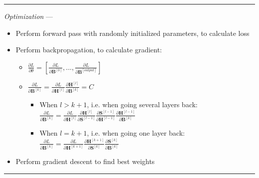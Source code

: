 {\color{lightgray}\hrule height 0.001mm}

\emph{Optimization} ---
\begin{itemize}
    \item Perform forward pass with randomly initialized parameters, to calculate loss
    \item Perform backpropagation, to calculate gradient:
    \begin{itemize}
        \item $\frac{\partial L}{\partial \theta} = [ \frac{\partial L}{\partial \boldsymbol{B}^{[0]}} , ..., \frac{\partial L}{\partial \boldsymbol{B}^{[output]}} ]$
        \item $\frac{\partial L}{\partial \boldsymbol{B}^{[k]} } = \frac{\partial L}{ \partial \boldsymbol{H}^{[l]} } \frac{ \partial \boldsymbol{H}^{[l]} }{ \partial \boldsymbol{B}^{[k]} } = C$
        \begin{itemize}
            \item When $l > k+1$, i.e. when going several layers back: $\frac{\partial L}{\partial \boldsymbol{B}^{[k]} } = \frac{\partial L}{ \partial \boldsymbol{H}^{[l]} }  \frac{ \partial \boldsymbol{H}^{[l]} }{ \partial \boldsymbol{S}^{[l-1]} } \frac{ \partial \boldsymbol{S}^{[l-1]} }{ \partial \boldsymbol{H}^{[l-1]} } \frac{ \partial \boldsymbol{H}^{[l-1]} }{ \partial \boldsymbol{B}^{[k]} }$ 
            \item When $l = k+1$, i.e. when going one layer back: $\frac{\partial L}{\partial \boldsymbol{B}^{[k]} } = \frac{\partial L}{ \partial \boldsymbol{H}^{[k+1]} }  \frac{ \partial \boldsymbol{H}^{[k+1]} }{ \partial \boldsymbol{S}^{[k]} } \frac{ \partial \boldsymbol{S}^{[k]} }{ \partial \boldsymbol{B}^{[k]} }$
        \end{itemize}
    \end{itemize}
    \item Perform gradient descent to find best weights 
\end{itemize}

{\color{lightgray}\hrule height 0.001mm}

